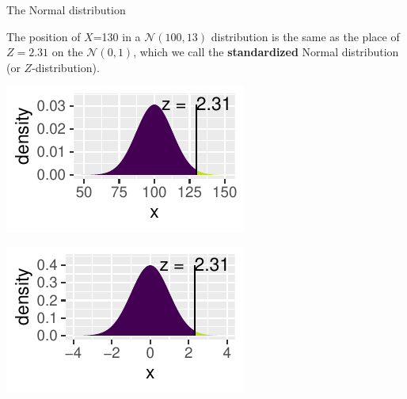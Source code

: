\documentclass[10pt,handout]{beamer}\usepackage[]{graphicx}\usepackage[]{color}
\newenvironment{knitrout}{}{} %
\begin{document}
\begin{frame}[fragile]{The Normal distribution}
	
	\vspace*{-.01in}
	
	\small{The position of $X$=130 in a $\mathcal{N}(100,13)$ distribution is the same as
		the place of $Z=2.31$ on the $\mathcal{N}(0,1)$, which we call the \textbf{standardized} Normal distribution (or	$Z$-distribution).}
	
	
\begin{knitrout}\tiny
{}\color{fgcolor}

{\centering \includegraphics[width=0.55\linewidth]{figure/probs-1} 

}




{\centering \includegraphics[width=0.55\linewidth]{figure/probs-2} 

}



\end{knitrout}
	
\end{frame} 

\end{document}
